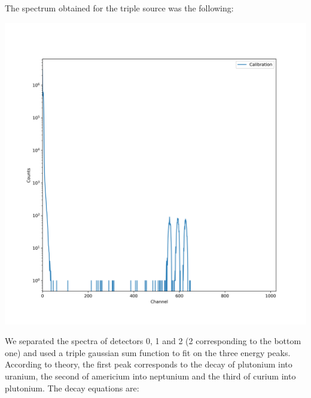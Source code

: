 \documentclass{article}
\begin{document}
\begin{multicols}{2}
The spectrum obtained for the triple source was the following:
\begin{center}
    \label{TT_21}
    \centering
    \includegraphics[scale = 0.3]{../../images/Calib.png}
    \vspace{-5mm}
\end{center}

We separated the spectra of
detectors 0, 1 and 2 (2 corresponding to the bottom one) and used a triple gaussian sum function to fit on the three energy peaks. According to theory, the first peak corresponds to the decay of plutonium into uranium, the second of americium into neptunium and the third of curium into plutonium. The decay equations are:


\end{multicols}
\end{document}
